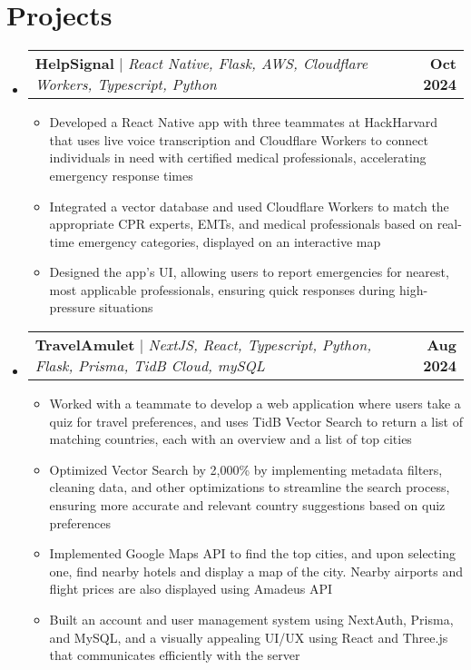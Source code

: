 \documentclass[letterpaper,11pt]{article}
\makeatletter
\newcommand{\resumeItem}[1]{
  \item\small{
    {#1 \vspace{-2pt}}
  }
}
\newcommand{\resumeProjectHeading}[2]{
    \item
    \begin{tabular*}{1.001\textwidth}{l@{\extracolsep{\fill}}r}
      \small#1 & \textbf{\small #2}\\
    \end{tabular*}\vspace{-7pt}
}
\newcommand{\resumeSubHeadingListStart}{\begin{itemize}[leftmargin=0.0in, label={}]}
\newcommand{\resumeSubHeadingListEnd}{\end{itemize}}
\newcommand{\resumeItemListStart}{\begin{itemize}}
\newcommand{\resumeItemListEnd}{\end{itemize}\vspace{-5pt}}
\makeatother
\begin{document}
\section{Projects}
  \vspace{-7pt}
    \resumeSubHeadingListStart
      \resumeProjectHeading
          {\textbf{HelpSignal} $|$ \emph{React Native, Flask, AWS, Cloudflare Workers, Typescript, Python}}{Oct 2024}
          \resumeItemListStart
            \resumeItem{Developed a React Native app with three teammates at HackHarvard that uses live voice transcription and Cloudflare Workers to connect individuals in need with certified medical professionals, accelerating emergency response times}
            \resumeItem{Integrated a vector database and used Cloudflare Workers to match the appropriate CPR experts, EMTs, and medical professionals based on real-time emergency categories, displayed on an interactive map}
            \resumeItem{Designed the app's UI, allowing users to report emergencies for nearest, most applicable professionals, ensuring quick responses during high-pressure situations}
        \resumeItemListEnd
      \vspace{-20pt} %
      \resumeProjectHeading
          {\textbf{TravelAmulet} $|$ \emph{NextJS, React, Typescript, Python, Flask, Prisma, TidB Cloud, mySQL}}{Aug 2024}
          \resumeItemListStart
            \resumeItem{Worked with a teammate to develop a web application where users take a quiz for travel preferences, and uses TidB Vector Search to return a list of matching countries, each with an overview and a list of top cities}
            \resumeItem{Optimized Vector Search by 2,000\% by implementing metadata filters, cleaning data, and other optimizations to streamline the search process, ensuring more accurate and relevant country suggestions based on quiz preferences}
            \resumeItem{Implemented Google Maps API to find the top cities, and upon selecting one, find nearby hotels and display a map of the city. Nearby airports and flight prices are also displayed using Amadeus API}
            \resumeItem{Built an account and user management system using NextAuth, Prisma, and MySQL, and a visually appealing UI/UX using React and Three.js that communicates efficiently with the server}
          \resumeItemListEnd
    \resumeSubHeadingListEnd
\end{document}
